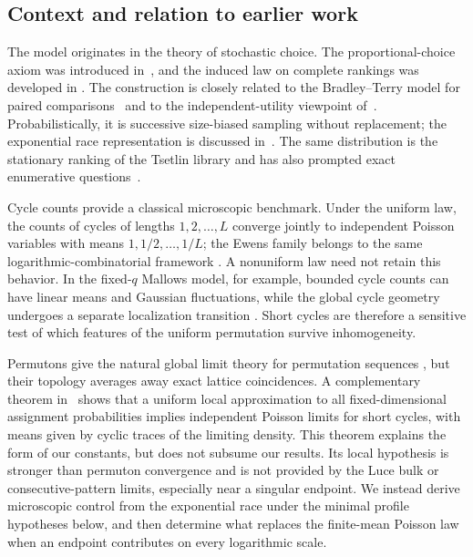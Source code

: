 \documentclass[11pt]{article}
\theoremstyle{remark}
\theoremstyle{plain}
\begin{document}
\subsection{Context and relation to earlier work}

The model originates in the theory of stochastic choice.  The
proportional-choice axiom was introduced in~\cite{luce1959individual}, and the
induced law on complete rankings was developed in
\cite{plackett1975analysis}.  The construction is closely related to the
Bradley--Terry model for paired comparisons~\cite{bradley1952rank} and to the
independent-utility viewpoint of~\cite{thurstone1927law}.  Probabilistically,
it is successive size-biased sampling without replacement; the exponential
race representation is discussed in~\cite{pitmantran2015sizebiased}.  The
same distribution is the stationary ranking of the Tsetlin library and has
also prompted exact enumerative questions~\cite{chatterjee2024enumerative}.

Cycle counts provide a classical microscopic benchmark.  Under the uniform
law, the counts of cycles of lengths $1,2,\ldots,L$ converge jointly to
independent Poisson variables with means $1,1/2,\ldots,1/L$; the Ewens family
belongs to the same logarithmic-combinatorial framework
\cite{arratia2003logarithmic,tavare2021magical}.  A nonuniform law need not
retain this behavior.  In the fixed-$q$ Mallows model, for example, bounded
cycle counts can have linear means and Gaussian fluctuations, while the
global cycle geometry undergoes a separate localization transition
\cite{gladkich2018cycle,he2023cycles}.  Short cycles are therefore a sensitive
test of which features of the uniform permutation survive inhomogeneity.

Permutons give the natural global limit theory for permutation sequences
\cite{hoppen2013limits}, but their topology averages away exact lattice
coincidences.  A complementary theorem in~\cite{mukherjee2016fixed} shows
that a uniform local approximation to all fixed-dimensional assignment
probabilities implies independent Poisson limits for short cycles, with means
given by cyclic traces of the limiting density.  This theorem explains the
form of our constants, but does not subsume our results.  Its local hypothesis
is stronger than permuton convergence and is not provided by the Luce bulk or
consecutive-pattern limits, especially near a singular endpoint.  We instead
derive microscopic control from the exponential race under the minimal
profile hypotheses below, and then determine what replaces the finite-mean
Poisson law when an endpoint contributes on every logarithmic scale.
\end{document}
